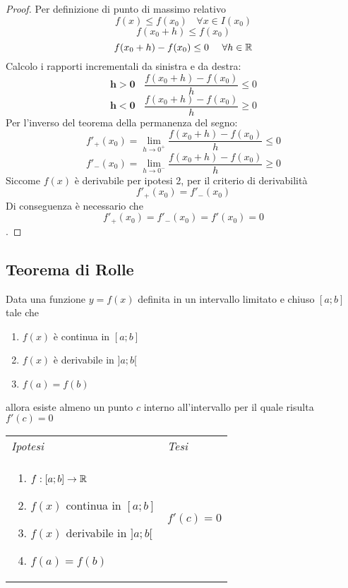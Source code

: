 \documentclass{article}     %
\begin{document}
        \begin{proof}
        Per definizione di punto di massimo relativo
        \[f(x) \leq f(x_0) ~~~~\forall x \in I(x_0)\]
        \[f(x_0+h)\leq f(x_0)\]
        \[f(x_0+h)-f(x_0)\leq 0~~~~ \forall h \in \mathbb{R}\]
        Calcolo i rapporti incrementali da sinistra e da destra:
        \[\mathbf{h>0}~~~~ \frac{f(x_0+h)-f(x_0)}{h}\leq 0\]
        \[\mathbf{h<0}~~~~ \frac{f(x_0+h)-f(x_0)}{h}\geq 0\]
        Per l'inverso del teorema della permanenza del segno:
        \[f'_+(x_0)=\lim_{h\to 0^+}\frac{f(x_0+h)-f(x_0)}{h}\leq 0\]
        \[f'_-(x_0)=\lim_{h\to 0^-}\frac{f(x_0+h)-f(x_0)}{h}\geq 0\]
        Siccome $f(x)$ è derivabile per ipotesi 2, per il criterio di derivabilità
        \[f'_+(x_0)=f'_-(x_0)\]
        Di conseguenza è necessario che \[f'_+(x_0)=f'_-(x_0)=f'(x_0)=0\].
        \end{proof}
        
    \subsection{Teorema di Rolle}
        \begin{shadedTheorem}[Rolle]
        Data una funzione $y=f(x)$ definita in un intervallo limitato e chiuso $[a;b]$ tale che \begin{enumerate}
            \item $f(x)$ è continua in $[a;b]$
            \item $f(x)$ è derivabile in $]a;b[$
            \item $f(a)=f(b)$
        \end{enumerate}
        allora esiste almeno un punto $c$ interno all'intervallo per il quale risulta $f'(c)=0$
        \end{shadedTheorem}
        \begin{tabular}{m{}m{}}
            \textit{Ipotesi} & \textit{Tesi}  \\
            \begin{enumerate}
            \item $f:[a;b] \to \mathbb{R}$
            \item $f(x)$ continua in $[a;b]$
            \item $f(x)$ derivabile in $]a;b[$
            \item $f(a)=f(b)$
        \end{enumerate} & $f'(c)=0$
        \end{tabular}
        
\end{document}
